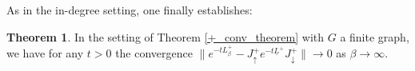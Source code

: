 \documentclass[reqno,12pt,letterpaper]{amsart}
\numberwithin{equation}{section}
\newcommand{\Lout}{L^{+}}
\newcommand{\1}{\mathds{1}}
\theoremstyle{definition}
\newtheorem{Thm}[Th]{Theorem}
\begin{document}
\medskip

As in the in-degree setting, one finally establishes:
\begin{Thm}\label{directed_semi_group_convergence_+}
	In the setting of Theorem \ref{+_conv_theorem} with $G$ a finite graph, we have for any $t  > 0$ the convergence 
	$\|e^{-t\Lout_\beta} - J^+_\uparrow  e^{-t\underline{L}^+} J^+_\downarrow\| \rightarrow 0$ as $\beta \rightarrow \infty$.
\end{Thm}


	
	
	
	
	
	
	
	
	
	
	
	
	
	
	
	
	
	
	
	
	
	
	
	
\end{document}

